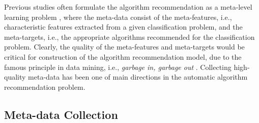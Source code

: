 \documentclass[acmsmall]{acmart}
\begin{document}
Previous studies often formulate the algorithm recommendation as a meta-level learning problem \cite{rice1975algorithm,smith2008cross},
where the meta-data consist of the meta-features, i.e., characteristic features extracted from a given classification problem, and
the meta-targets, i.e., the appropriate algorithms recommended for the classification problem.
Clearly, the quality of the meta-features and meta-targets would be critical for construction of the algorithm recommendation model, due to the famous principle in data mining, i.e., \textit{garbage in, garbage out} \cite{lee1999cleansing}.
Collecting high-quality meta-data has been one of main directions in the automatic algorithm recommendation problem.



%
%



\subsection{Meta-data Collection}

\end{document}
